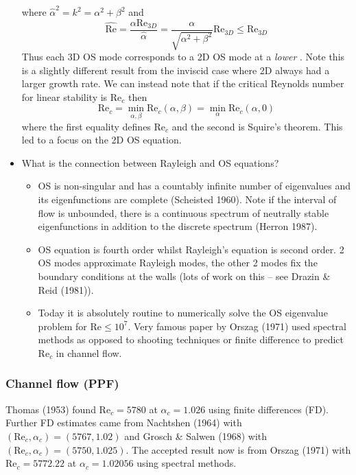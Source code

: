 \documentclass{jknotes}
\newcommand{\ReN}{\text{Re}}
\begin{document}
\begin{itemize}
		where $\hat{\alpha}^2 = k^2 = \alpha^2 + \beta^2$ and
		\begin{equation}
			\hat{\ReN} = \frac{\alpha \ReN_{3D}}{\hat{\alpha}} =
			\frac{\alpha}{\sqrt{\alpha^2 + \beta^2}}\ReN_{3D} \le \ReN_{3D}
		\end{equation}
		Thus each 3D OS mode corresponds to a 2D OS mode at a \emph{lower}
		\ReN. Note this is a slightly different result from the inviscid case
		where 2D always had a larger growth rate. We can instead note that if
		the critical Reynolds number for linear stability is $\ReN_c$ then
		\begin{equation}
			\ReN_c = \min_{\alpha,\beta} \ReN_c(\alpha,\beta) = \min_{\alpha}
			\ReN_c(\alpha,0)
		\end{equation}
		where the first equality defines $\ReN_c$ and the second is Squire's
		theorem. This led to a focus on the 2D OS equation.
	\item What is the connection between Rayleigh and OS equations? 
		\begin{itemize}
			\item OS is non-singular and has a countably infinite number of
				eigenvalues and its eigenfunctions are complete (Scheisted
				1960). Note if the interval of flow is unbounded, there is a
				continuous spectrum of neutrally stable eigenfunctions in
				addition to the discrete spectrum (Herron 1987). 
			\item OS equation is fourth order whilst Rayleigh's equation is
				second order. 2 OS modes approximate Rayleigh modes, the other
				2 modes fix the boundary conditions at the walls (lots of work
				on this -- see Drazin \& Reid (1981)).
			\item Today it is absolutely routine to numerically solve the OS
				eigenvalue problem for $\ReN \le 10^7$. Very famous paper by
				Orszag (1971) used spectral methods as opposed to shooting
				techniques or finite difference to predict $\ReN_c$ in channel
				flow.
		\end{itemize}
\end{itemize}

\subsubsection{Channel flow (PPF)}
Thomas (1953) found $\ReN_c = 5780$ at $\alpha_c = 1.026$ using finite
differences (FD). Further FD estimates came from Nachtshen (1964) with
$(\ReN_c, \alpha_c) = (5767,1.02)$ and Grosch \& Salwen (1968) with $(\ReN_c,
\alpha_c) = (5750, 1.025)$. The accepted result now is from Orszag (1971) with
$\ReN_c = 5772.22$ at $\alpha_c = 1.02056$ using spectral methods.
\end{document}
